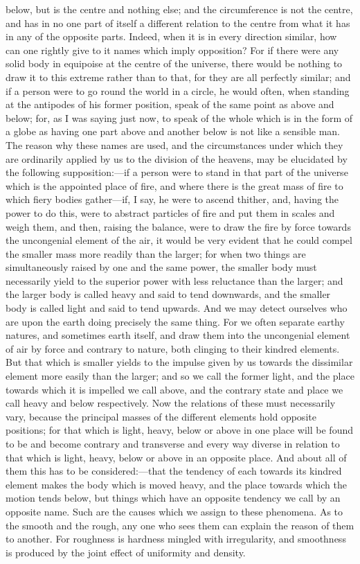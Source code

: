 below, but is the centre and nothing else; and the circumference is not
the centre, and has in no one part of itself a different relation to the
centre from what it has in any of the opposite parts. Indeed, when it is
in every direction similar, how can one rightly give to it names which
imply opposition? For if there were any solid body in equipoise at the
centre of the universe, there would be nothing to draw it to this extreme
rather than to that, for they are all perfectly similar; and if a person
were to go round the world in a circle, he would often, when standing at
the antipodes of his former position, speak of the same point as above and
below; for, as I was saying just now, to speak of the whole which is in
the form of a globe as having one part above and another below is not like
a sensible man. The reason why these names are used, and the circumstances
under which they are ordinarily applied by us to the division of the
heavens, may be elucidated by the following supposition:—if a person
were to stand in that part of the universe which is the appointed place of
fire, and where there is the great mass of fire to which fiery bodies
gather—if, I say, he were to ascend thither, and, having the power
to do this, were to abstract particles of fire and put them in scales and
weigh them, and then, raising the balance, were to draw the fire by force
towards the uncongenial element of the air, it would be very evident that
he could compel the smaller mass more readily than the larger; for when
two things are simultaneously raised by one and the same power, the
smaller body must necessarily yield to the superior power with less
reluctance than the larger; and the larger body is called heavy and said
to tend downwards, and the smaller body is called light and said to tend
upwards. And we may detect ourselves who are upon the earth doing
precisely the same thing. For we often separate earthy natures, and
sometimes earth itself, and draw them into the uncongenial element of air
by force and contrary to nature, both clinging to their kindred elements.
But that which is smaller yields to the impulse given by us towards the
dissimilar element more easily than the larger; and so we call the former
light, and the place towards which it is impelled we call above, and the
contrary state and place we call heavy and below respectively. Now the
relations of these must necessarily vary, because the principal masses of
the different elements hold opposite positions; for that which is light,
heavy, below or above in one place will be found to be and become contrary
and transverse and every way diverse in relation to that which is light,
heavy, below or above in an opposite place. And about all of them this has
to be considered:—that the tendency of each towards its kindred
element makes the body which is moved heavy, and the place towards which
the motion tends below, but things which have an opposite tendency we call
by an opposite name. Such are the causes which we assign to these
phenomena. As to the smooth and the rough, any one who sees them can
explain the reason of them to another. For roughness is hardness mingled
with irregularity, and smoothness is produced by the joint effect of
uniformity and density.


